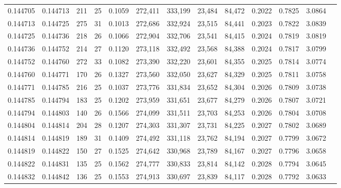 \begin{tabular}{rrrrrrrrrrrrr}
0.144705 & 0.144713 & 211 &  25 &                                     0.1059 & 272,411 & 333,199 &  23,484 &  84,472 & 0.2022 & 0.7825 & 3.0864 \\
0.144713 & 0.144725 & 275 &  31 &                                     0.1013 & 272,686 & 332,924 &  23,515 &  84,441 & 0.2023 & 0.7822 & 3.0839 \\
0.144725 & 0.144736 & 218 &  26 &                                     0.1066 & 272,904 & 332,706 &  23,541 &  84,415 & 0.2024 & 0.7819 & 3.0819 \\
0.144736 & 0.144752 & 214 &  27 &                                     0.1120 & 273,118 & 332,492 &  23,568 &  84,388 & 0.2024 & 0.7817 & 3.0799 \\
0.144752 & 0.144760 & 272 &  33 &                                     0.1082 & 273,390 & 332,220 &  23,601 &  84,355 & 0.2025 & 0.7814 & 3.0774 \\
0.144760 & 0.144771 & 170 &  26 &                                     0.1327 & 273,560 & 332,050 &  23,627 &  84,329 & 0.2025 & 0.7811 & 3.0758 \\
0.144771 & 0.144785 & 216 &  25 &                                     0.1037 & 273,776 & 331,834 &  23,652 &  84,304 & 0.2026 & 0.7809 & 3.0738 \\
0.144785 & 0.144794 & 183 &  25 &                                     0.1202 & 273,959 & 331,651 &  23,677 &  84,279 & 0.2026 & 0.7807 & 3.0721 \\
0.144794 & 0.144803 & 140 &  26 &                                     0.1566 & 274,099 & 331,511 &  23,703 &  84,253 & 0.2026 & 0.7804 & 3.0708 \\
0.144804 & 0.144814 & 204 &  28 &                                     0.1207 & 274,303 & 331,307 &  23,731 &  84,225 & 0.2027 & 0.7802 & 3.0689 \\
0.144814 & 0.144819 & 189 &  31 &                                     0.1409 & 274,492 & 331,118 &  23,762 &  84,194 & 0.2027 & 0.7799 & 3.0672 \\
0.144819 & 0.144822 & 150 &  27 &                                     0.1525 & 274,642 & 330,968 &  23,789 &  84,167 & 0.2027 & 0.7796 & 3.0658 \\
0.144822 & 0.144831 & 135 &  25 &                                     0.1562 & 274,777 & 330,833 &  23,814 &  84,142 & 0.2028 & 0.7794 & 3.0645 \\
0.144832 & 0.144842 & 136 &  25 &                                     0.1553 & 274,913 & 330,697 &  23,839 &  84,117 & 0.2028 & 0.7792 & 3.0633 \\

\end{tabular}
